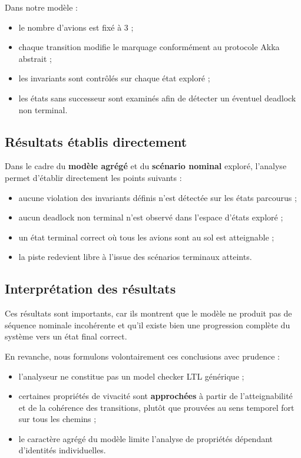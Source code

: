 \documentclass[11pt,a4paper]{article}
\begin{document}
Dans notre modèle :
\begin{itemize}
    \item le nombre d'avions est fixé à 3 ;
    \item chaque transition modifie le marquage conformément au protocole Akka abstrait ;
    \item les invariants sont contrôlés sur chaque état exploré ;
    \item les états sans successeur sont examinés afin de détecter un éventuel deadlock non terminal.
\end{itemize}

\subsection{Résultats établis directement}

Dans le cadre du \textbf{modèle agrégé} et du \textbf{scénario nominal} exploré, l'analyse permet d'établir directement les points suivants :
\begin{itemize}
    \item aucune violation des invariants définis n'est détectée sur les états parcourus ;
    \item aucun deadlock non terminal n'est observé dans l'espace d'états exploré ;
    \item un état terminal correct où tous les avions sont au sol est atteignable ;
    \item la piste redevient libre à l'issue des scénarios terminaux atteints.
\end{itemize}

\subsection{Interprétation des résultats}

Ces résultats sont importants, car ils montrent que le modèle ne produit pas de séquence nominale incohérente et qu'il existe bien une progression complète du système vers un état final correct.

En revanche, nous formulons volontairement ces conclusions avec prudence :
\begin{itemize}
    \item l'analyseur ne constitue pas un model checker LTL générique ;
    \item certaines propriétés de vivacité sont \textbf{approchées} à partir de l'atteignabilité et de la cohérence des transitions, plutôt que prouvées au sens temporel fort sur tous les chemins ;
    \item le caractère agrégé du modèle limite l'analyse de propriétés dépendant d'identités individuelles.
\end{itemize}
\end{document}

